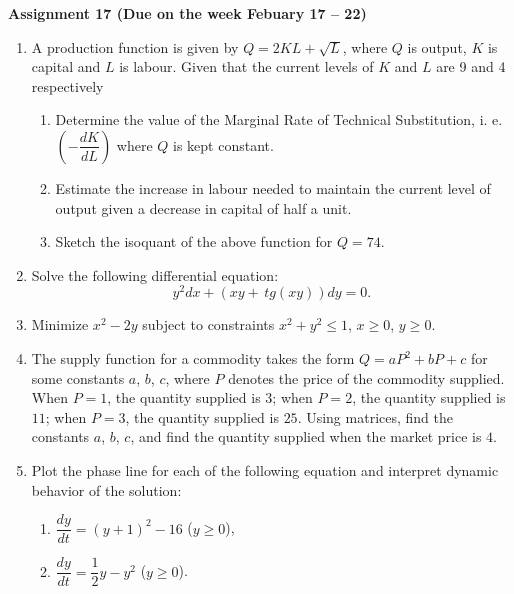 \documentclass{article}
\begin{document}
\fontsize{14}{21}
\selectfont
\centerline{\textbf{Assignment 17 (Due on the week Febuary 17 -- 22)}}
\fontsize{12}{18}
\selectfont
\begin{enumerate}
\item A production function is given by $Q=2KL+\sqrt{L}$, where $Q$ is output, $K$ is capital and $L$ is labour. Given that the current levels of $K$ and $L$ are 9 and 4 respectively
    \begin{enumerate}
    \item Determine the value of the Marginal Rate of Technical Substitution, i. e. $\left(-\dfrac{dK}{dL}\right)$ where $Q$ is kept constant.
    \item Estimate the increase in labour needed to maintain the current level of output given a decrease in capital of half a unit.
    \item Sketch the isoquant of the above function for $Q = 74$.
\end{enumerate}

\item Solve the following differential equation: $$y^2dx+(xy+\mathrm\,{tg}(xy))dy=0.$$

\item Minimize $x^2-2y$ subject to constraints $x^2+y^2\leqslant 1$, $x\geqslant 0$, $y\geqslant 0$.

\item The supply function for a commodity takes the form $Q=aP^2+bP+c$ for some constants $a$, $b$, $c$, where $P$ denotes the price of the commodity supplied. When $P = 1$, the quantity supplied is $3$; when $P =2$, the quantity supplied is $11$; when $P = 3$, the quantity supplied is $25$. Using matrices, find the constants $a$, $b$, $c$, and find the quantity supplied when the market price is $4$.

\item Plot the phase line for each of the following equation and interpret dynamic behavior of the solution:
\begin{enumerate}
\item $\dfrac{dy}{dt}=(y+1)^2-16$ ($y\geqslant 0$),
\item $\dfrac {dy}{dt}=\dfrac 12y-y^2$ ($y\geqslant 0$).
\end{enumerate}
\end{enumerate}
\end{document}
